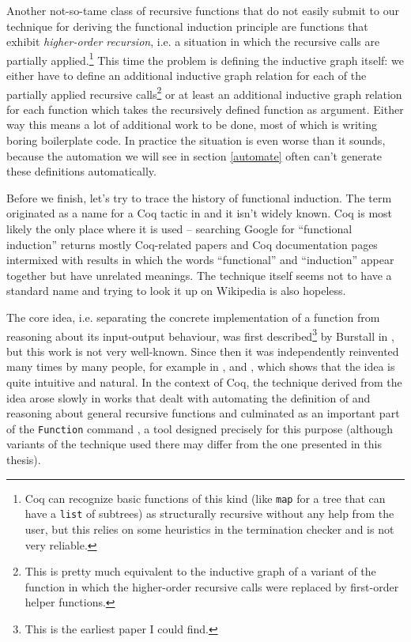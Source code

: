 \documentclass[declaration,mgr,english,shortabstract]{iithesis}
\newcommand{\m}[1]{\texttt{#1}}
\begin{document}
Another not-so-tame class of recursive functions that do not easily submit to our technique for deriving the functional induction principle are functions that exhibit \textit{higher-order recursion}, i.e. a situation in which the recursive calls are partially applied.\footnote{Coq can recognize basic functions of this kind (like \m{map} for a tree that can have a \m{list} of subtrees) as structurally recursive without any help from the user, but this relies on some heuristics in the termination checker and is not very reliable.} This time the problem is defining the inductive graph itself: we either have to define an additional inductive graph relation for each of the partially applied recursive calls\footnote{This is pretty much equivalent to the inductive graph of a variant of the function in which the higher-order recursive calls were replaced by first-order helper functions.} or at least an additional inductive graph relation for each function which takes the recursively defined function as argument. Either way this means a lot of additional work to be done, most of which is writing boring boilerplate code. In practice the situation is even worse than it sounds, because the automation we will see in section \ref{automate} often can't generate these definitions automatically.

Before we finish, let's try to trace the history of functional induction. The term originated as a name for a Coq tactic in \cite{FunInd} and it isn't widely known. Coq is most likely the only place where it is used -- searching Google for ``functional induction'' returns mostly Coq-related papers and Coq documentation pages intermixed with results in which the words ``functional'' and ``induction'' appear together but have unrelated meanings. The technique itself seems not to have a standard name and trying to look it up on Wikipedia is also hopeless.

The core idea, i.e. separating the concrete implementation of a function from reasoning about its input-output behaviour, was first described\footnote{This is the earliest paper I could find.} by Burstall in \cite{Burstall}, but this work is not very well-known. Since then it was independently reinvented many times by many people, for example in \cite{Slind}, \cite{FromTheLeft} and \cite{Program}, which shows that the idea is quite intuitive and natural. In the context of Coq, the technique derived from the idea arose slowly in works that dealt with automating the definition of and reasoning about general recursive functions and culminated as an important part of the \m{Function} command \cite{Function}, a tool designed precisely for this purpose (although variants of the technique used there may differ from the one presented in this thesis).
\end{document}
